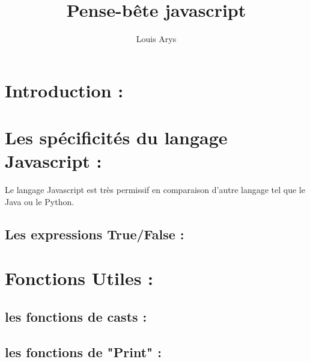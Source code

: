 \documentclass[a4paper, 11pt]{scrarticle}
\title{Pense-bête javascript}
\author{Louis Arys}
\begin{document}
\maketitle
\tableofcontents

\section{Introduction : }

\section{Les spécificités du langage Javascript :}

Le langage Javascript est très permissif en comparaison d'autre langage tel que le Java ou le Python.

\subsection{Les expressions True/False :}

\section{Fonctions Utiles : }

\subsection{les fonctions de casts :}

\subsection{les fonctions de "Print" :}
\end{document}
